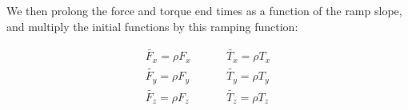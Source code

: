 \begin{enumerate}
 

We then prolong the force and torque end times as a function of the ramp slope, and multiply the initial functions by this ramping function:

\begin{align}
\tilde{F_x} = \rho F_{x} &\hspace{1cm} \tilde{T_x} =\rho T_{x}  \\ 
\tilde{F_y} =  \rho F_{y}  &\hspace{1cm} \tilde{T_y} =\rho  T_{y} \\ 
\tilde{F_z} = \rho F_{z} &\hspace{1cm} \tilde{T_z} =\rho  T_{z} 
\end{align}

\end{enumerate}